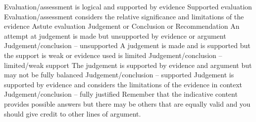 \documentclass{article}
\begin{document}
Evaluation/assessment is \newline
logical and supported by \newline
evidence \newline
Supported evaluation \newline
Evaluation/assessment \newline
considers the relative \newline
significance and limitations of \newline
the evidence \newline
Astute evaluation \newline
Judgement or Conclusion or \newline
Recommendation  \newline
An attempt at judgement is \newline
made but unsupported by \newline
evidence or argument \newline
Judgement/conclusion – \newline
unsupported  \newline
A judgement is made and is \newline
supported but the support is \newline
weak or evidence used is \newline
limited \newline
Judgement/conclusion – \newline
limited/weak support \newline
The judgement is supported \newline
by evidence and argument \newline
but may not be fully balanced \newline
Judgement/conclusion –\newline
supported  \newline
Judgement is supported by \newline
evidence and considers the \newline
limitations of the evidence in \newline
context \newline
Judgement/conclusion – \newline
fully justified  \newline
 \newline
Remember that the indicative content provides possible answers but there may be others that are \newline
equally valid and you should give credit to other lines of argument.  \newline
\end{document}
